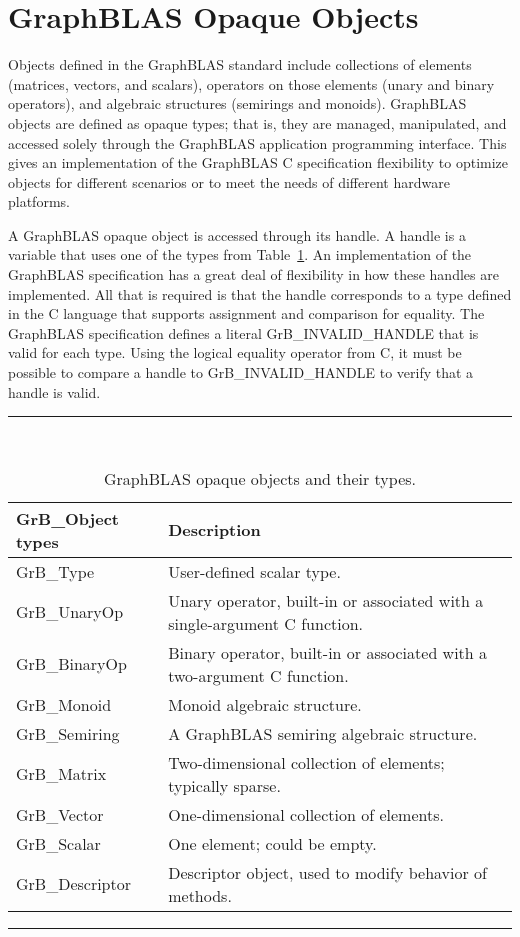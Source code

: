 \section{GraphBLAS Opaque Objects }

Objects defined in the GraphBLAS standard include collections of elements
(matrices, vectors, and scalars), operators on those elements (unary and binary operators), and 
algebraic structures (semirings and monoids).   GraphBLAS objects are defined
as opaque types; that is, they are managed, manipulated, and accessed solely through the
GraphBLAS application programming interface. This gives an implementation of the
GraphBLAS C specification flexibility to optimize objects for different scenarios or to meet
the needs of different hardware platforms.

A GraphBLAS opaque object is accessed through its handle.  A handle
is a variable that uses one of the types from Table~\ref{Tab:ObjTypes}.  An implementation 
of the GraphBLAS specification has a great deal of flexibility in how these
handles are implemented.  All that is required is that the handle corresponds to a type defined in the 
C language that supports assignment and comparison for equality.  The
GraphBLAS specification defines a 
literal {\sf GrB\_INVALID\_HANDLE} that is valid for each type.  Using the logical equality 
operator from C, it must be possible to compare a handle to {\sf GrB\_INVALID\_HANDLE}
to verify that a handle is valid.


\begin{table}
\hrule
\begin{center}
\caption{GraphBLAS opaque objects and their types.}
\label{Tab:ObjTypes}
~\\
\begin{tabular}{l|l}
{\sf GrB\_Object types} & Description \\
\hline
{\sf GrB\_Type}           & User-defined scalar type.     \\
{\sf GrB\_UnaryOp}        & Unary operator, built-in or associated with a single-argument C function.     \\
{\sf GrB\_BinaryOp}       & Binary operator, built-in or associated with a two-argument C function.     \\
{\sf GrB\_Monoid}         & Monoid algebraic structure.     \\
{\sf GrB\_Semiring}       & A GraphBLAS semiring algebraic structure.     \\
{\sf GrB\_Matrix}         & Two-dimensional collection of elements; typically sparse.    \\
{\sf GrB\_Vector}         & One-dimensional collection of elements.     \\
{\sf GrB\_Scalar}         & One element; could be empty. \\
{\sf GrB\_Descriptor}     & Descriptor object, used to modify behavior of methods.     \\
\end{tabular}
\end{center}
\hrule
\end{table}

